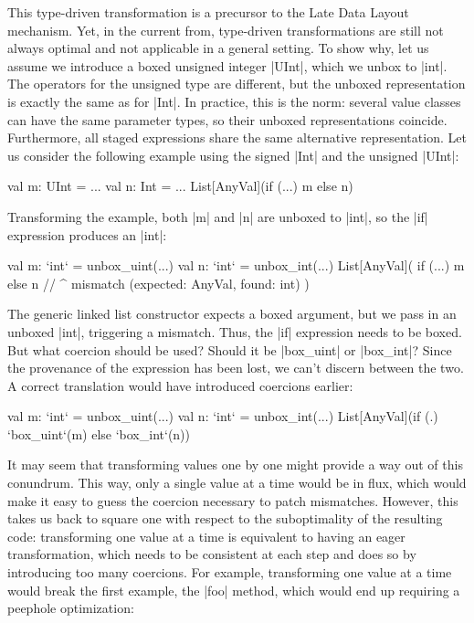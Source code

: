 This type-driven transformation is  a precursor to the Late Data Layout mechanism. Yet, in the current from, type-driven transformations are still not always optimal and not applicable in a general setting. To show why, let us assume we introduce a boxed unsigned integer |UInt|, which we unbox to |int|. The operators for the unsigned type are different, but the unboxed representation is exactly the same as for |Int|. In practice, this is the norm: several value classes can have the same parameter types, so their unboxed representations coincide. Furthermore, all staged expressions share the same alternative representation. Let us consider the following example using the signed |Int| and the unsigned |UInt|:

\begin{lstlisting-nobreak}
 val m: UInt = ...
 val n: Int = ...
 List[AnyVal](if (...) m else n)
\end{lstlisting-nobreak}

Transforming the example, both |m| and |n| are unboxed to |int|, so the |if| expression produces an |int|:

\begin{lstlisting-nobreak}
 val m: `int` = unbox_uint(...)
 val n: `int` = unbox_int(...)
 List[AnyVal](
   if (...) m else n
   // ^ mismatch (expected: AnyVal, found: int)
 )
\end{lstlisting-nobreak}

The generic linked list constructor expects a boxed argument, but we pass in an unboxed |int|, triggering a mismatch. Thus, the |if| expression needs to be boxed. But what coercion should be used? Should it be |box_uint| or |box_int|? Since the provenance of the expression has been lost, we can't discern between the two. A correct translation would have introduced coercions earlier:

\begin{lstlisting-nobreak}
 val m: `int` = unbox_uint(...)
 val n: `int` = unbox_int(...)
 List[AnyVal](if (.) `box_uint`(m) else `box_int`(n))
\end{lstlisting-nobreak}

It may seem that transforming values one by one might provide a way out of this conundrum. This way, only a single value at a time would be in flux, which would make it easy to guess the coercion necessary to patch mismatches. However, this takes us back to square one with respect to the suboptimality of the resulting code: transforming one value at a time is equivalent to having an eager transformation, which needs to be consistent at each step and does so by introducing too many coercions. For example, transforming one value at a time would break the first example, the |foo| method, which would end up requiring a peephole optimization:

